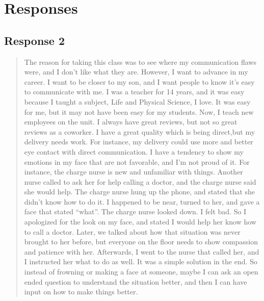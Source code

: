 
\section{Responses}
  \subsection{Response 2}
    \begin{quotation}
      The reason for taking this class was to see where my communication flaws
        were, and I don't like what they are. However, I want to advance in my
        career. I want to be closer to my son, and I want people to know it's
        easy to communicate with me. I was a teacher for 14 years, and it was
        easy because I taught a subject, Life and Physical Science, I love. It
        was easy for me, but it may not have been easy for my students. Now, I
        teach new employees on the unit. I always have great reviews, but not so
        great reviews as a coworker. I have a great quality which is being
        direct,but my delivery needs work. For instance, my delivery could use
        more and better eye contact with direct communication. I have a tendency
        to show my emotions in my face that are not favorable, and I'm not proud
        of it. For instance, the charge nurse is new and unfamiliar with things.
        Another nurse called to ask her for help calling a doctor, and the
        charge nurse said she would help. The charge nurse hung up the phone,
        and stated that she didn't know how to do it. I happened to be near,
        turned to her, and gave a face that stated ``what''. The charge nurse
        looked down. I felt bad. So I apologized for the look on my face, and
        stated I would help her know how to call a doctor. Later, we talked
        about how that situation was never brought to her before, but everyone
        on the floor needs to show compassion and patience with her. Afterwards,
        I went to the nurse that called her, and I instructed her what to do as
        well. It was a simple solution in the end. So instead of frowning or
        making a face at someone, maybe I can ask an open ended question to
        understand the situation better, and then I can have input on how to
        make things better.


\end{quotation}

